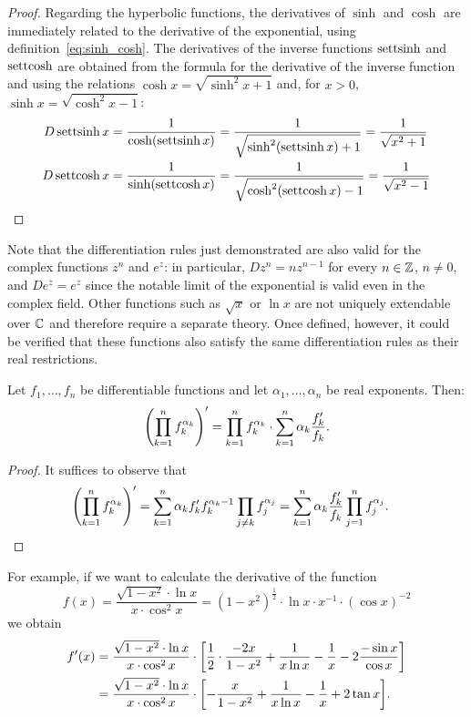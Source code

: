 \begin{proof}
Regarding the hyperbolic functions, the derivatives of $\sinh$
and $\cosh$ are immediately related to the derivative of the exponential,
using
definition~\eqref{eq:sinh_cosh}. The derivatives of the inverse functions
$\operatorname{settsinh}$ and $\operatorname{settcosh}$ are obtained from the formula for the derivative
of the inverse function and using
the relations $\cosh x = \sqrt{\sinh^2 x+1}$ and, for $x > 0$,
$\sinh x = \sqrt{\cosh^2 x -1}$:
\begin{align*}
  D \operatorname{settsinh} x &= \frac{1}{\cosh(\operatorname{settsinh} x)}
  = \frac{1}{\sqrt{\sinh^2 (\operatorname{settsinh} x) + 1}} = \frac{1}{\sqrt{x^2+1}}\\
  D \operatorname{settcosh} x &= \frac{1}{\sinh(\operatorname{settcosh} x)}
  = \frac{1}{\sqrt{\cosh^2(\operatorname{settcosh} x)-1}}
  = \frac{1}{\sqrt{x^2-1}}
\end{align*}
\end{proof}

Note that the differentiation rules just demonstrated 
are also valid for the complex functions $z^n$ and $e^z$:
in particular, $D z^n = nz^{n-1}$ for every $n\in {\mathbb Z}$,
$n\neq 0$, and $D e^z = e^z$ since the notable 
limit of the exponential is valid even in the complex field.
Other functions such as $\sqrt{x}$ 
or $\ln x$ are not uniquely extendable over ${\mathbb C}$
and therefore require a separate theory. 
Once defined, however, it could be verified 
that these functions also satisfy the same differentiation rules 
as their real restrictions.

\begin{proposition}
Let $f_1,\dots, f_n$ be differentiable functions and let $\alpha_1,\dots,
\alpha_n$
be real exponents. Then:
  \[
  {\left( \prod_{k=1}^n f_k^{\alpha_k} \right)}'
  = \prod_{k=1}^n f_k^{\alpha_k} \cdot \sum_{k=1}^n \alpha_k \frac{f_k'}{f_k}.
  \]
\end{proposition}
\begin{proof}
It suffices to observe that 
\begin{align*}
  {\left( \prod_{k=1}^n f_k^{\alpha_k} \right)}'
  &= \sum_{k=1}^n \alpha_k f_k' f_k^{\alpha_k-1} \prod_{j\neq k} f_j^{\alpha_j}
  = \sum_{k=1}^n \alpha_k \frac{f_k'}{f_k} \prod_{j=1}^n f_j^{\alpha_j}.
\end{align*}
\end{proof}
For example, if we want to calculate the derivative of the function 
\[
 f(x) = \frac{\sqrt{1-x^2}\cdot \ln x}{x\cdot \cos^2 x}
 = (1-x^2)^{\frac 1 2} \cdot \ln x \cdot x^{-1}\cdot (\cos x)^{-2}
\]
we obtain 
\begin{align*}
  f'(x) 
  &= \frac{\sqrt{1-x^2}\cdot \ln x}{x\cdot \cos^2 x}
  \cdot {\left[ \frac 1 2 \cdot \frac{-2x}{1-x^2} + \frac{1}{x\ln x} - \frac{1}{x}-2\frac{-\sin x}{\cos x} \right]}\\
  &=\frac{\sqrt{1-x^2}\cdot \ln x}{x\cdot \cos^2 x}
  \cdot {\left[ -\frac{x}{1-x^2} + \frac{1}{x\ln x} - \frac{1}{x}+2\operatorname{tan}x \right]}.
\end{align*}